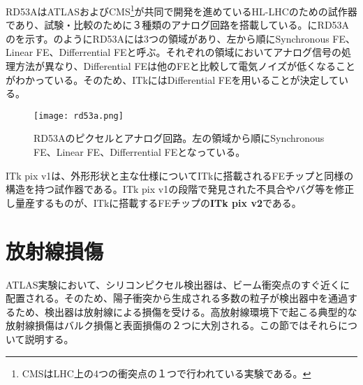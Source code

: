 RD53AはATLASおよびCMS\footnote{CMSはLHC上の4つの衝突点の１つで行われている実験である。}が共同で開発を進めているHL-LHCのための試作器であり、試験・比較のために３種類のアナログ回路を搭載している。にRD53Aのを示す。のようにRD53Aには3つの領域があり、左から順にSynchronous FE、Linear FE、Differrential FEと呼ぶ。それぞれの領域においてアナログ信号の処理方法が異なり、Differential FEは他のFEと比較して電気ノイズが低くなることがわかっている。そのため、ITkにはDifferential FEを用いることが決定している。

\begin{figure}[tbp]
  \centering
  \texttt{[image: rd53a.png]}
  \caption[RD53Aのピクセルとアナログ回路]{RD53Aのピクセルとアナログ回路\cite{rd53a}。左の領域から順にSynchronous FE、Linear FE、Differrential FEとなっている。}
  \label{fig:rd53a}
\end{figure}

ITk pix v1は、外形形状と主な仕様についてITkに搭載されるFEチップと同様の構造を持つ試作器である。ITk pix v1の段階で発見された不具合やバグ等を修正し量産するものが、ITkに搭載するFEチップの\textbf{ITk pix v2}である。



\section{放射線損傷}
\label{sec:houshasennsonnshou}
ATLAS実験において、シリコンピクセル検出器は、ビーム衝突点のすぐ近くに配置される。そのため、陽子衝突から生成される多数の粒子が検出器中を通過するため、検出器は放射線による損傷を受ける。高放射線環境下で起こる典型的な放射線損傷はバルク損傷と表面損傷の２つに大別される。この節ではそれらについて説明する。


